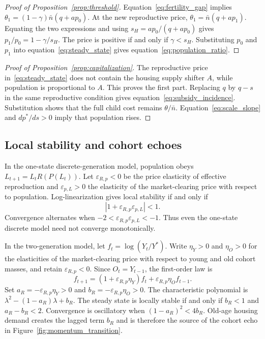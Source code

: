 \documentclass[11pt]{article}
\theoremstyle{definition}
\begin{document}
\begin{proof}[Proof of Proposition~\ref{prop:threshold}]
Equation~\eqref{eq:fertility_gap} implies
$\theta_1=(1-\gamma)\bar n(q+ap_0)$. At the new reproductive price,
$\theta_1=\bar n(q+ap_1)$. Equating the two expressions and using
$s_H=ap_0/(q+ap_0)$ gives
$p_1/p_0=1-\gamma/s_H$. The price is positive if and only if
$\gamma<s_H$. Substituting $p_0$ and $p_1$ into
equation~\eqref{eq:steady_state} gives equation~\eqref{eq:population_ratio}.
\end{proof}

\begin{proof}[Proof of Proposition~\ref{prop:capitalization}]
The reproductive price in~\eqref{eq:steady_state} does not contain the housing
supply shifter $A$, while population is proportional to $A$. This proves the
first part. Replacing $q$ by $q-s$ in the same reproductive condition gives
equation~\eqref{eq:subsidy_incidence}. Substitution shows that the full child
cost remains $\theta/\bar n$. Equation~\eqref{eq:scale_slope} and
$dp^*/ds>0$ imply that population rises.
\end{proof}

\subsection*{Local stability and cohort echoes}

In the one-state discrete-generation model, population obeys
$L_{t+1}=L_tR(P(L_t))$. Let $\varepsilon_{R,p}<0$ be the price elasticity of
effective reproduction and $\varepsilon_{p,L}>0$ the elasticity of the
market-clearing price with respect to population. Log-linearization gives local
stability if and only if
\begin{equation}
 \left|1+\varepsilon_{R,p}\varepsilon_{p,L}\right|<1.
 \label{eq:discrete_stability}
\end{equation}
Convergence alternates when
$-2<\varepsilon_{R,p}\varepsilon_{p,L}<-1$. Thus even the one-state discrete
model need not converge monotonically.

In the two-generation model, let $f_t=\log(Y_t/Y^*)$. Write $\eta_Y>0$ and
$\eta_O>0$ for the elasticities of the market-clearing price with respect to
young and old cohort masses, and retain $\varepsilon_{R,p}<0$. Since
$O_t=Y_{t-1}$, the first-order law is
\begin{equation}
 f_{t+1}=(1+\varepsilon_{R,p}\eta_Y)f_t
 +\varepsilon_{R,p}\eta_O f_{t-1}.
 \label{eq:two_cohort_local_law}
\end{equation}
Set $a_R=-\varepsilon_{R,p}\eta_Y>0$ and
$b_R=-\varepsilon_{R,p}\eta_O>0$. The characteristic polynomial is
$\lambda^2-(1-a_R)\lambda+b_R$. The steady state is locally stable if and only
if $b_R<1$ and $a_R-b_R<2$. Convergence is oscillatory when
$(1-a_R)^2<4b_R$. Old-age housing demand creates the lagged term $b_R$ and is
therefore the source of the cohort echo in Figure~\ref{fig:momentum_transition}.
\end{document}
